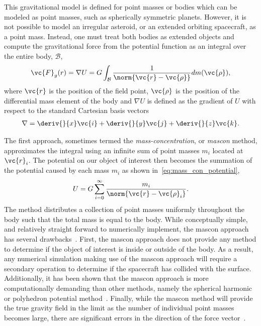 This gravitational model is defined for point masses or bodies which can be modeled as point masses, such as spherically symmetric planets.
However, it is not possible to model an irregular asteroid, or an extended orbiting spacecraft, as a point mass.
Instead, one must treat both bodies as extended objects and compute the gravitational force from the potential function as an integral over the entire body, \( \mathcal{B}\),
\begin{align}\label{eq:volume_integral_potential}
    \vc{F}_g ( r) = \nabla U = G \int_{\mathcal{B}} \frac{1}{\norm{\vc{r} - \vc{\rho} }} dm (\vc{\rho}),
\end{align}
where \( \vc{r} \) is the position of the field point, \( \vc{\rho} \) is the position of the differential mass element of the body and \( \nabla U \) is defined as the gradient of \( U \) with respect to the standard Cartesian basis vectors
\begin{align*}
    \nabla = \deriv{}{x} \vc{i} + \deriv{}{y} \vc{j} + \deriv{}{z} \vc{k}.
\end{align*}

The first approach, sometimes termed the \textit{mass-concentration}, or \textit{mascon} method, approximates the integral using an infinite sum of point masses \( m_i\) located at \( \vc{r}_i \).
The potential on our object of interest then becomes the summation of the potential caused by each mass \( m_i \) as shown in~\cref{eq:mass_con_potential},
\begin{align}\label{eq:mass_con_potential}
    U = G \sum_{i=0}^{\infty} \frac{m_i}{\norm{\vc{r} - \vc{\rho}_i}}.
\end{align}
The method distributes a collection of point masses uniformly throughout the body such that the total mass is equal to the body.
While conceptually simple, and relatively straight forward to numerically implement, the mascon approach has several drawbacks~\cite{scheeres2012a}.
First, the mascon approach does not provide any method to determine if the object of interest is inside or outside of the body.
As a result, any numerical simulation making use of the mascon approach will require a secondary operation to determine if the spacecraft has collided with the surface.
Additionally, it has been shown that the mascon approach is more computationally demanding than other methods, namely the spherical harmonic or polyhedron potential method~\cite{werner1996}.
Finally, while the mascon method will provide the true gravity field in the limit as the number of individual point masses becomes large, there are significant errors in the direction of the force vector~\cite{werner1996}.

